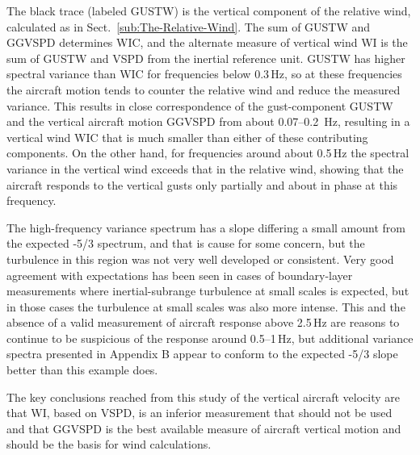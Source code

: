 \documentclass[12pt,twoside,english]{article}\usepackage[]{graphicx}\usepackage[]{color}
\begin{document}
{{The black trace (labeled GUSTW) is the vertical component of the relative wind, calculated as in Sect.~\ref{sub:The-Relative-Wind}. The sum of GUSTW and GGVSPD determines WIC, and the alternate measure of vertical wind WI is the sum of GUSTW and VSPD from the inertial reference unit. GUSTW has higher spectral variance than WIC for frequencies below 0.3\,Hz, so at these frequencies the aircraft motion tends to counter the relative wind and reduce the measured variance. This results in close correspondence of the gust-component GUSTW and the vertical aircraft motion GGVSPD from about 0.07--0.2~Hz, resulting in a vertical wind WIC that is much smaller than either of these contributing components. On the other hand, for frequencies around about 0.5\,Hz the spectral variance in the vertical wind exceeds that in the relative wind, showing that the aircraft responds to the vertical gusts only partially and about in phase at this frequency. 

The high-frequency variance spectrum has a slope differing a small amount from the expected -5/3 spectrum, and that is cause for some concern, but the turbulence in this region was not very well developed or consistent. Very good agreement with expectations has been seen in cases of boundary-layer measurements where inertial-subrange turbulence at small scales is expected, but in those cases the turbulence at small scales was also more intense. This and the absence of a valid measurement of aircraft response above 2.5\,Hz are reasons to continue to be suspicious of the response around 0.5--1\,Hz, but additional variance spectra presented in Appendix B appear to conform to the expected -5/3 slope  better than this example does. %

The key conclusions reached from this study of the vertical aircraft velocity are that WI, based on VSPD, is an inferior measurement that should not be used and that GGVSPD is the best available measure of aircraft vertical motion and should be the basis for wind calculations.

}}
\end{document}

